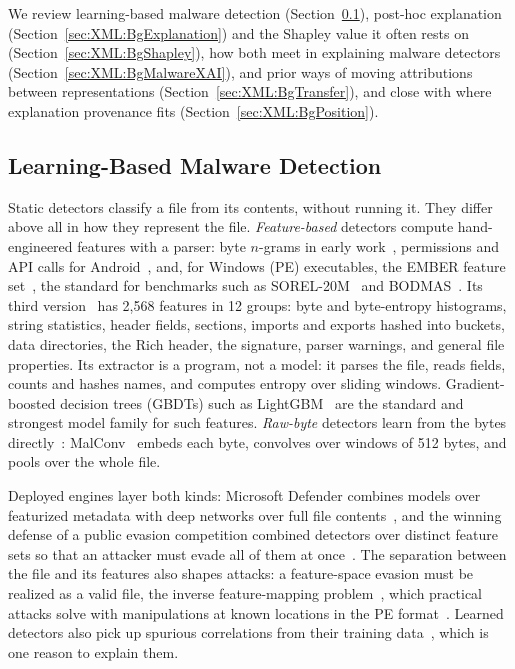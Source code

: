 We review learning-based malware detection (Section~\ref{sec:XML:BgDetection}), post-hoc explanation
(Section~\ref{sec:XML:BgExplanation}) and the Shapley value it often rests on (Section~\ref{sec:XML:BgShapley}), how both meet in explaining malware detectors (Section~\ref{sec:XML:BgMalwareXAI}),
and prior ways of moving attributions between representations (Section~\ref{sec:XML:BgTransfer}), and close with where
explanation provenance fits (Section~\ref{sec:XML:BgPosition}).

\subsection{Learning-Based Malware Detection}
\label{sec:XML:BgDetection}

Static detectors classify a file from its contents, without running it. They differ above all in how they represent the
file. \emph{Feature-based} detectors compute hand-engineered features with a parser: byte $n$-grams in early
work~\cite{schultz2001data, kolter2004learning}, permissions and API calls for Android~\cite{arp2014drebin}, and, for
Windows (PE) executables, the EMBER feature set~\cite{anderson2018ember}, the standard for benchmarks such as
SOREL-20M~\cite{harang2020sorel} and BODMAS~\cite{yang2021bodmas}. Its third version~\cite{joyce2025ember} has 2{,}568
features in 12 groups: byte and byte-entropy histograms, string statistics, header fields, sections, imports and
exports hashed into buckets, data directories, the Rich header, the signature, parser warnings, and general file
properties. Its extractor is a program, not a model: it parses the file, reads fields, counts and hashes names, and
computes entropy over sliding windows. Gradient-boosted decision trees (GBDTs) such as LightGBM~\cite{ke2017lightgbm}
are the standard and strongest model family for such features. \emph{Raw-byte} detectors learn from the bytes
directly~\cite{raff2018malware, krvcal2018deep, raff2021classifying}: MalConv~\cite{raff2018malware} embeds each byte,
convolves over windows of 512 bytes, and pools over the whole file.

Deployed engines layer both kinds: Microsoft Defender combines models over featurized metadata with deep networks over
full file contents~\cite{microsoft2019insideout}, and the winning defense of a public evasion competition combined
detectors over distinct feature sets so that an attacker must evade all of them at once~\cite{quiring2020against}. The
separation between the file and its features also shapes attacks: a feature-space evasion must be realized as a valid
file, the inverse feature-mapping problem~\cite{pierazzi2020intriguing}, which practical attacks solve with
manipulations at known locations in the PE format~\cite{demetrio2021adversarial}. Learned detectors also pick up
spurious correlations from their training data~\cite{arp2022and}, which is one reason to explain them.

